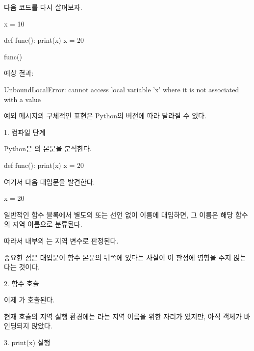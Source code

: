 다음 코드를 다시 살펴보자.

\begin{dhkcode}
x = 10

def func():
    print(x)
    x = 20

func()
\end{dhkcode}

예상 결과:

\begin{dhkzsh}
UnboundLocalError: cannot access local variable 'x' 
where it is not associated with a value
\end{dhkzsh}

예외 메시지의 구체적인 표현은 Python의 버전에 따라 달라질 수 있다.

\begin{dhknote}
\begin{dhksmry}[centered]
1. 컴파일 단계
\end{dhksmry}
\end{dhknote}

Python은 의 본문을 분석한다.

\begin{dhkcode}
def func():
    print(x)
    x = 20
\end{dhkcode}

여기서 다음 대입문을 발견한다.

\begin{dhkcode}
x = 20
\end{dhkcode}

일반적인 함수 블록에서 별도의  또는  선언 없이 이름에 대입하면, 그 이름은 해당 함수의 지역 이름으로 분류된다.

따라서  내부의 는 지역 변수로 판정된다.

중요한 점은 대입문이 함수 본문의 뒤쪽에 있다는 사실이 이 판정에 영향을 주지 않는다는 것이다.

\begin{dhknote}
\begin{dhksmry}[centered]
2. 함수 호출
\end{dhksmry}
\end{dhknote}

이제 가 호출된다.

현재 호출의 지역 실행 환경에는 라는 지역 이름을 위한 자리가 있지만, 아직 객체가 바인딩되지 않았다.

\begin{dhknote}
\begin{dhksmry}[centered]
3. print(x) 실행
\end{dhksmry}
\end{dhknote}

